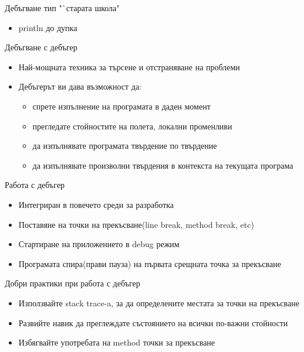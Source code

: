 \documentclass{beamer}
\begin{document}
\begin{frame}{Дебъгване тип "`старата школа"}
  \transdissolve
  \begin{itemize}
  \item println до дупка
  \end{itemize}
\end{frame}

\begin{frame}{Дебъгване с дебъгер}
  \transdissolve
  \begin{itemize}
  \item Най-мощната техника за търсене и отстраняване на проблеми
  \item Дебъгерът ви дава възможност да:
    \begin{itemize}
      \item спрете изпълнение на програмата в даден момент
      \item прегледате стойностите на полета, локални променливи
      \item да изпълнявате програмата твърдение по твърдение
      \item да изпълнявате произволни твърдения в контекста на
        текущата програма 
    \end{itemize}

  \end{itemize}
\end{frame}

\begin{frame}{Работа с дебъгер}
  \transdissolve
  \begin{itemize}
  \item Интегриран в повечето среди за разработка
  \item Поставяне на точки на прекъсване(line break, method break,
    etc)
  \item Стартиране на приложението в debug режим
  \item Програмата спира(прави пауза) на първата срещната точка за
    прекъсване
  \end{itemize}
\end{frame}

\begin{frame}{Добри практики при работа с дебъгер}
  \transdissolve
  \begin{itemize}
  \item Използвайте stack trace-a, за да определените местата за точки
    на прекъсване
  \item Развийте навик да преглеждате състоянието на всички по-важни
    стойности
  \item Избягвайте употребата на method точки за прекъсване
  \end{itemize}
\end{frame}
\end{document}
